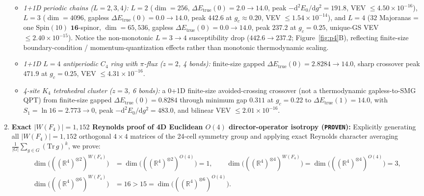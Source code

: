 \documentclass[11pt,a4paper]{article}
\begin{document}
\begin{enumerate}
\begin{itemize}
        \item \emph{1+1D periodic chains ($L=2, 3, 4$):} $L=2$ ($\dim=256$, $\Delta E_{\mathrm{true}}(0)=2.0 \to 14.0$, peak $-\mathrm{d}^2 E_0/\mathrm{d}g^2 = 191.8$, VEV $\le 4.50\times 10^{-16}$), $L=3$ ($\dim=4096$, gapless $\Delta E_{\mathrm{true}}(0)=0.0 \to 14.0$, peak $442.6$ at $g_c\approx 0.20$, VEV $\le 1.54\times 10^{-14}$), and $L=4$ ($32$ Majoranas = one $\mathrm{Spin}(10)$ $\mathbf{16}$-spinor, $\dim=65{,}536$, gapless $\Delta E_{\mathrm{true}}(0)=0.0 \to 14.0$, peak $237.2$ at $g_c=0.25$, unique-GS VEV $\le 2.40\times 10^{-15}$). Notice the non-monotonic $L=3\to 4$ susceptibility drop ($442.6 \to 237.2$; Figure~\ref{fig:p4}B), reflecting finite-size boundary-condition / momentum-quantization effects rather than monotonic thermodynamic scaling.
        \item \emph{1+1D $L=4$ antiperiodic $C_4$ ring with $\pi$-flux ($z=2$, 4 bonds):} finite-size gapped $\Delta E_{\mathrm{true}}(0) = 2.8284 \to 14.0$, sharp crossover peak $471.9$ at $g_c = 0.25$, VEV $\le 4.31\times 10^{-16}$.
        \item \emph{4-site $K_4$ tetrahedral cluster ($z=3$, 6 bonds):} a 0+1D finite-size avoided-crossing crossover (not a thermodynamic gapless-to-SMG QPT) from finite-size gapped $\Delta E_{\mathrm{true}}(0) = 0.8284$ through minimum gap $0.311$ at $g_c = 0.22$ to $\Delta E_{\mathrm{true}}(1) = 14.0$, with $S_1 = \ln 16 = 2.773 \to 0$, peak $-\mathrm{d}^2 E_0/\mathrm{d}g^2 = 483.0$, and bilinear VEV $\le 2.01\times 10^{-16}$.
    \end{itemize}
    \item \textbf{Exact $|W(F_4)| = 1{,}152$ Reynolds proof of 4D Euclidean $O(4)$ director-operator isotropy (\texttt{PROVEN}):}
    Explicitly generating all $|W(F_4)| = 1{,}152$ orthogonal $4\times 4$ matrices of the 24-cell symmetry group and applying exact Reynolds character averaging $\frac{1}{|G|}\sum_{g\in G} (\mathrm{Tr}\,g)^k$, we prove:
    \begin{equation}
    \begin{aligned}
        \dim\bigl(((\mathbb{R}^4)^{\otimes 2})^{W(F_4)}\bigr) &= \dim\bigl(((\mathbb{R}^4)^{\otimes 2})^{O(4)}\bigr) = 1, \qquad
        \dim\bigl(((\mathbb{R}^4)^{\otimes 4})^{W(F_4)}\bigr) = \dim\bigl(((\mathbb{R}^4)^{\otimes 4})^{O(4)}\bigr) = 3, \\
        \dim\bigl(((\mathbb{R}^4)^{\otimes 6})^{W(F_4)}\bigr) &= 16 > 15 = \dim\bigl(((\mathbb{R}^4)^{\otimes 6})^{O(4)}\bigr).
    \end{aligned}

\end{equation}
\end{enumerate}
\end{document}
